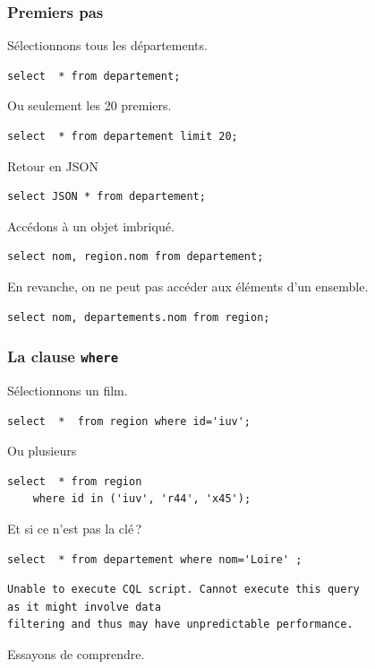 \documentclass[aspectratio=169]{beamer} %
\begin{document}
\begin{frame}[fragile] \frametitle{Premiers pas}

Sélectionnons tous les départements.

\begin{verbatim}
select  * from departement;
\end{verbatim}

\vfill

Ou seulement les 20 premiers.
\begin{verbatim}
select  * from departement limit 20;
\end{verbatim}

\vfill
Retour en JSON
\begin{verbatim}
select JSON * from departement;
\end{verbatim}

\vfill
Accédons à un objet imbriqué.
\begin{verbatim}
select nom, region.nom from departement;
\end{verbatim}

\vfill
En revanche, on ne peut pas accéder aux éléments d'un ensemble.
\begin{verbatim}
select nom, departements.nom from region;
\end{verbatim}
\end{frame}

\begin{frame}[fragile] \frametitle{La clause \texttt{where}}

Sélectionnons un film.

\begin{verbatim}
select  *  from region where id='iuv';
\end{verbatim}

Ou plusieurs

\begin{verbatim}
select  * from region 
    where id in ('iuv', 'r44', 'x45');
\end{verbatim}
 
Et si ce n'est pas la clé\,?

\begin{verbatim}
select  * from departement where nom='Loire' ;
\end{verbatim}

\begin{verbatim}
Unable to execute CQL script. Cannot execute this query 
as it might involve data
filtering and thus may have unpredictable performance. 
\end{verbatim}

Essayons de comprendre.
\end{frame}
\end{document}
